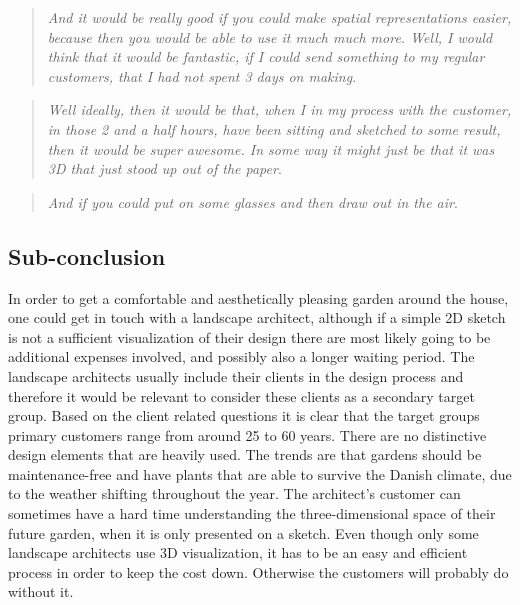 		\begin{quote}
			\textit{And it would be really good if you could make spatial representations easier, because then you would be able to use it much much more. Well, I would think that it would be fantastic, if I could send something to my regular customers, that I had not spent 3 days on making}\label{quote:expertIdeas2}.\\
		\end{quote}
		
		\begin{quote}
			\textit{Well ideally, then it would be that, when I in my process with the customer, in those 2 and a half hours, have been sitting and sketched to some result, then it would be super awesome. In some way it might just be that it was 3D that just stood up out of the paper}\label{quote:expertIdeas3}.\\
		\end{quote}
		
		\begin{quote}
			\textit{And if you could put on some glasses and then draw out in the air}\label{quote:expertIdeas4}.\\
		\end{quote}
		
	\subsection{Sub-conclusion}
		In order to get a comfortable and aesthetically pleasing garden around the house, one could get in touch with a landscape architect, although if a simple 2D sketch is not a sufficient visualization of their design there are most likely going to be additional expenses involved, and possibly also a longer waiting period.
		The landscape architects usually include their clients in the design process and therefore it would be relevant to consider these clients as a secondary target group. Based on the client related questions it is clear that the target groups primary customers range from around 25 to 60 years. There are no distinctive design elements that are heavily used. The trends are that gardens should be maintenance-free and have plants that are able to survive the Danish climate, due to the weather shifting throughout the year. The architect's customer can sometimes have a hard time understanding the three-dimensional space of their future garden, when it is only presented on a sketch. Even though only some landscape architects use 3D visualization, it has to be an easy and efficient process in order to keep the cost down. Otherwise the customers will probably do without it.
		
